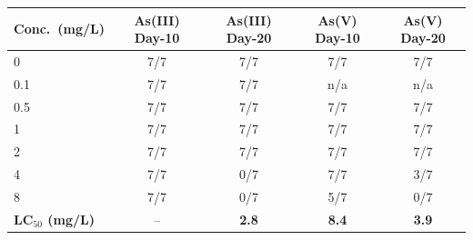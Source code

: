 \begin{tabular}{lcccc}
  \toprule
  Conc.\ (mg/L) & As(III) Day-10 & As(III) Day-20 & As(V) Day-10 & As(V) Day-20 \\
  \midrule
  0 & 7/7 & 7/7 & 7/7 & 7/7 \\
  0.1 & 7/7 & 7/7 & n/a & n/a \\
  0.5 & 7/7 & 7/7 & 7/7 & 7/7 \\
  1 & 7/7 & 7/7 & 7/7 & 7/7 \\
  2 & 7/7 & 7/7 & 7/7 & 7/7 \\
  4 & 7/7 & 0/7 & 7/7 & 3/7 \\
  8 & 7/7 & 0/7 & 5/7 & 0/7 \\
  \textbf{LC$_{50}$ (mg/L)} & -- & \textbf{2.8} & \textbf{8.4} & \textbf{3.9} \\
  \bottomrule
\end{tabular}
